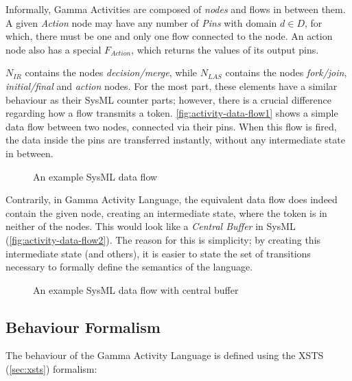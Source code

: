 \begin{definition}
Informally, Gamma Activities are composed of \emph{nodes} and flows in between them. A given  \emph{Action} node may have any number of \emph{Pins} with domain \(d \in D\), for which, there must be one and only one flow connected to the node. An action node also has a special \(F_{Action}\), which returns the values of its output pins.

\(N_\mathit{IR}\) contains the nodes \emph{decision/merge}, while \(N_\mathit{LAS}\) contains the nodes \emph{fork/join}, \emph{initial/final} and \emph{action} nodes. For the most part, these elements have a similar behaviour as their SysML counter parts; however, there is a crucial difference regarding how a flow transmits a token. \autoref{fig:activity-data-flow1} shows a simple data flow between two nodes, connected via their pins. When this flow is fired, the data inside the pins are transferred instantly, without any intermediate state in between. 

\begin{figure}[!ht]
	\centering
	
	\caption{An example SysML data flow}
	\label{fig:activity-data-flow1}
\end{figure}

Contrarily, in Gamma Activity Language, the equivalent data flow does indeed contain the given node, creating an intermediate state, where the token is in neither of the nodes. This would look like a \emph{Central Buffer} in SysML (\autoref{fig:activity-data-flow2}). The reason for this is simplicity; by creating this intermediate state (and others), it is easier to state the set of transitions necessary to formally define the semantics of the language.

\begin{figure}[!ht]
	\centering
	
	\caption{An example SysML data flow with central buffer}
	\label{fig:activity-data-flow2}
\end{figure}
	
\end{definition}\label{def:activity-structure}

\subsection{Behaviour Formalism}

The behaviour of the Gamma Activity Language is defined using the XSTS (\autoref{sec:xsts}) formalism:

